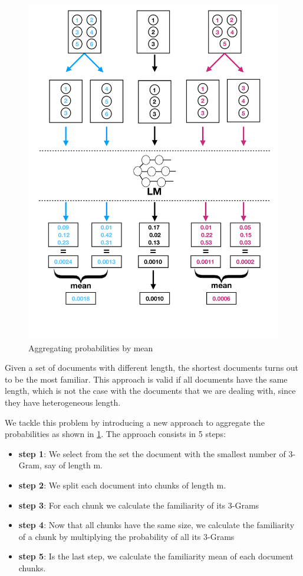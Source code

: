 \documentclass[12pt,mscthesis]{usiinfthesis}
\begin{document}
			\begin{figure}[htbp]
			\centering
			\includegraphics[width=\textwidth]{aggregation-by-mean}
			\caption{Aggregating probabilities by mean}
			\label{aggregation-by-mean}
			\end{figure}
		
		Given a set of documents with different length, the shortest documents turns out to be the most familiar. This approach is valid if all documents have the same length, which is not the case with the documents that we are dealing with, since they have heterogeneous length. 


		We tackle this problem by introducing a new approach to aggregate the probabilities as shown in \cref{aggregation-by-mean}.
		The approach consists in 5 steps: 
		\begin{itemize}
			\item \textbf{step 1}: We select from the set the document with the smallest number of 3-Gram, say of length m.
			\item \textbf{step 2}: We split each document into chunks of length m.
			\item \textbf{step 3}: For each chunk we calculate the familiarity of its 3-Grams
			\item \textbf{step 4}: Now that all chunks have the same size, we calculate the familiarity of a chunk by multiplying the probability of all its 3-Grams
			\item \textbf{step 5}: Is the last step, we calculate the familiarity mean of each document chunks.
		\end{itemize}
\end{document}
